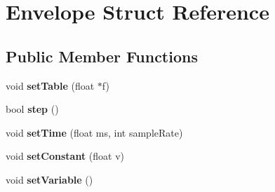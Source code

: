 \hypertarget{struct_envelope}{}\section{Envelope Struct Reference}
\label{struct_envelope}
\subsection*{Public Member Functions}
\begin{DoxyCompactItemize}
\item 
\mbox{\label{struct_envelope_a771b7781fc1bba9c3b753657b40ee2d9}} 
void {\bfseries set\+Table} (float $\ast$f)
\item 
\mbox{\label{struct_envelope_a75d878d352a50f6e43d030dfa2718953}} 
bool {\bfseries step} ()
\item 
\mbox{\label{struct_envelope_a0e70d5ec385b25d483096f122217761d}} 
void {\bfseries set\+Time} (float ms, int sample\+Rate)
\item 
\mbox{\label{struct_envelope_a94ddc48c4c868c09872b1ab84df21b28}} 
void {\bfseries set\+Constant} (float v)
\item 
\mbox{\label{struct_envelope_a1b0c7a6814e3a45040df81bc1c1fe425}} 
void {\bfseries set\+Variable} ()
\end{DoxyCompactItemize}
